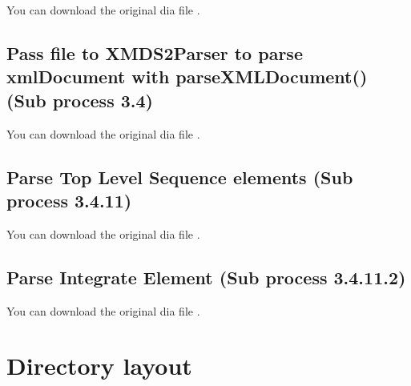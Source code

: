 \documentclass[letterpaper,10pt,english]{sphinxmanual}
\begin{document}
\sphinxAtStartPar
You can download the original dia file .


\subsection{Pass file to XMDS2Parser to parse xmlDocument with parseXMLDocument() (Sub process 3.4)}
\label{\detokenize{developer:pass-file-to-xmds2parser-to-parse-xmldocument-with-parsexmldocument-sub-process-3-4}}

\sphinxAtStartPar
You can download the original dia file .


\subsection{Parse Top Level Sequence elements (Sub process 3.4.11)}
\label{\detokenize{developer:parse-top-level-sequence-elements-sub-process-3-4-11}}

\sphinxAtStartPar
You can download the original dia file .


\subsection{Parse Integrate Element (Sub process 3.4.11.2)}
\label{\detokenize{developer:parse-integrate-element-sub-process-3-4-11-2}}

\sphinxAtStartPar
You can download the original dia file .

\ignorespaces 

\section{Directory layout}
\label{\detokenize{developer:directory-layout}}\label{\detokenize{developer:index-6}}
\end{document}
